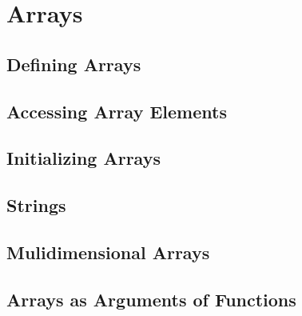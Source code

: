 \section{Arrays}

\subsection{Defining Arrays}
\subsection{Accessing Array Elements}
\subsection{Initializing Arrays}
\subsection{Strings}
\subsection{Mulidimensional Arrays}
\subsection{Arrays as Arguments of Functions}